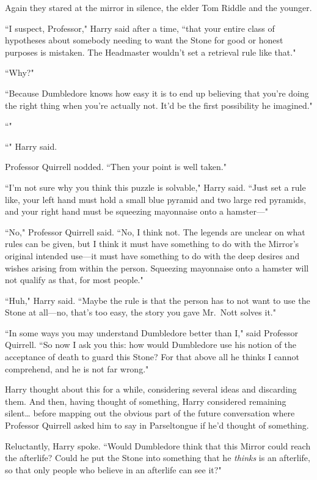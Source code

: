 Again they stared at the mirror in silence, the elder Tom Riddle and the younger.

``I suspect, Professor," Harry said after a time, ``that your entire class of hypotheses about somebody needing to want the Stone for good or honest purposes is mistaken. The Headmaster wouldn't set a retrieval rule like that."

``Why?"

``Because Dumbledore knows how easy it is to end up believing that you're doing the right thing when you're actually not. It'd be the first possibility he imagined."

``"

``" Harry said.

Professor Quirrell nodded. ``Then your point is well taken."

``I'm not sure why you think this puzzle is solvable," Harry said. ``Just set a rule like, your left hand must hold a small blue pyramid and two large red pyramids, and your right hand must be squeezing mayonnaise onto a hamster---"

``No," Professor Quirrell said. ``No, I think not. The legends are unclear on what rules can be given, but I think it must have something to do with the Mirror's original intended use---it must have something to do with the deep desires and wishes arising from within the person. Squeezing mayonnaise onto a hamster will not qualify as that, for most people."

``Huh," Harry said. ``Maybe the rule is that the person has to not want to use the Stone at all---no, that's too easy, the story you gave Mr.~Nott solves it."

``In some ways you may understand Dumbledore better than I," said Professor Quirrell. ``So now I ask you this: how would Dumbledore use his notion of the acceptance of death to guard this Stone? For that above all he thinks I cannot comprehend, and he is not far wrong."

Harry thought about this for a while, considering several ideas and discarding them. And then, having thought of something, Harry considered remaining silent{\ldots} before mapping out the obvious part of the future conversation where Professor Quirrell asked him to say in Parseltongue if he'd thought of something.

Reluctantly, Harry spoke. ``Would Dumbledore think that this Mirror could reach the afterlife? Could he put the Stone into something that he \emph{thinks} is an afterlife, so that only people who believe in an afterlife can see it?"

